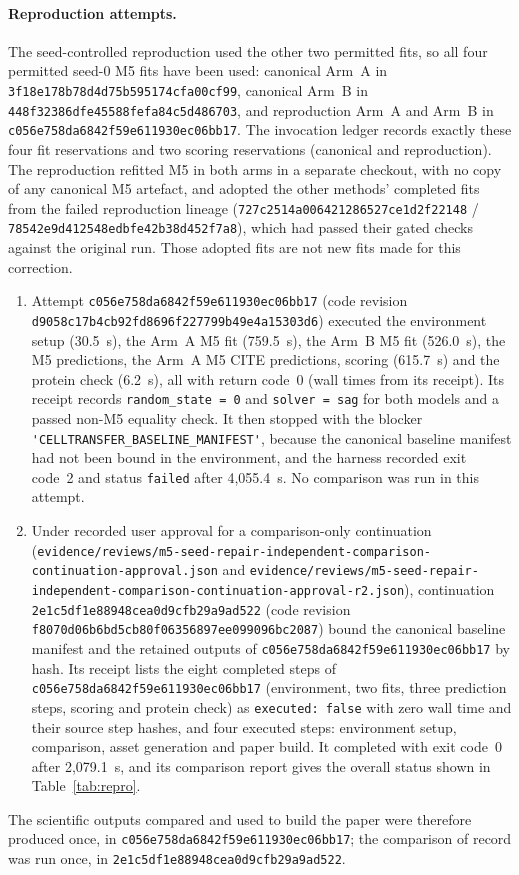 \documentclass[11pt]{article}
\newcommand{\runid}{\nolinkurl{448f32386dfe45588fefa84c5d486703}}
\newcommand{\failrunid}{\nolinkurl{78542e9d412548edbfe42b38d452f7a8}}
\newcommand{\cfailid}{\nolinkurl{c056e758da6842f59e611930ec06bb17}}
\newcommand{\ccontid}{\nolinkurl{2e1c5df1e88948cea0d9cfb29a9ad522}}
\newcommand{\code}[1]{\texttt{#1}}
\begin{document}
\paragraph{Reproduction attempts.} The seed-controlled reproduction used the other two permitted fits, so all four permitted seed-0 M5 fits have been used: canonical Arm~A in \nolinkurl{3f18e178b78d4d75b595174cfa00cf99}, canonical Arm~B in \runid, and reproduction Arm~A and Arm~B in \cfailid. The invocation ledger records exactly these four fit reservations and two scoring reservations (canonical and reproduction). The reproduction refitted M5 in both arms in a separate checkout, with no copy of any canonical M5 artefact, and adopted the other methods' completed fits from the failed reproduction lineage (\nolinkurl{727c2514a006421286527ce1d2f22148} / \failrunid), which had passed their gated checks against the original run. Those adopted fits are not new fits made for this correction.
\begin{enumerate}
\item Attempt \cfailid{} (code revision \nolinkurl{d9058c17b4cb92fd8696f227799b49e4a15303d6}) executed the environment setup (30.5~s), the Arm~A M5 fit (759.5~s), the Arm~B M5 fit (526.0~s), the M5 predictions, the Arm~A M5 CITE predictions, scoring (615.7~s) and the protein check (6.2~s), all with return code~0 (wall times from its receipt). Its receipt records \code{random\_state = 0} and \code{solver = sag} for both models and a passed non-M5 equality check. It then stopped with the blocker \verb|'CELLTRANSFER_BASELINE_MANIFEST'|, because the canonical baseline manifest had not been bound in the environment, and the harness recorded exit code~2 and status \verb|failed| after 4{,}055.4~s. No comparison was run in this attempt.
\item Under recorded user approval for a comparison-only continuation (\nolinkurl{evidence/reviews/m5-seed-repair-independent-comparison-continuation-approval.json} and \nolinkurl{evidence/reviews/m5-seed-repair-independent-comparison-continuation-approval-r2.json}), continuation \ccontid{} (code revision \nolinkurl{f8070d06b6bd5cb80f06356897ee099096bc2087}) bound the canonical baseline manifest and the retained outputs of \cfailid{} by hash. Its receipt lists the eight completed steps of \cfailid{} (environment, two fits, three prediction steps, scoring and protein check) as \verb|executed: false| with zero wall time and their source step hashes, and four executed steps: environment setup, comparison, asset generation and paper build. It completed with exit code~0 after 2{,}079.1~s, and its comparison report gives the overall status shown in Table~\ref{tab:repro}.
\end{enumerate}
The scientific outputs compared and used to build the paper were therefore produced once, in \cfailid; the comparison of record was run once, in \ccontid.
\end{document}
